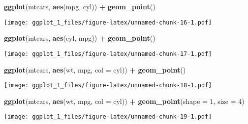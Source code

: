 \documentclass[]{article}
\newenvironment{Shaded}{\begin{snugshade}}{\end{snugshade}}
\newcommand{\DataTypeTok}[1]{\textcolor[rgb]{0.13,0.29,0.53}{#1}}
\newcommand{\DecValTok}[1]{\textcolor[rgb]{0.00,0.00,0.81}{#1}}
\newcommand{\KeywordTok}[1]{\textcolor[rgb]{0.13,0.29,0.53}{\textbf{#1}}}
\newcommand{\NormalTok}[1]{#1}
\newcommand{\OperatorTok}[1]{\textcolor[rgb]{0.81,0.36,0.00}{\textbf{#1}}}
\newcommand{\StringTok}[1]{\textcolor[rgb]{0.31,0.60,0.02}{#1}}
\begin{document}
\begin{Shaded}
\begin{Highlighting}[]
\KeywordTok{ggplot}\NormalTok{(mtcars, }\KeywordTok{aes}\NormalTok{(mpg, cyl)) }\OperatorTok{+}\StringTok{ }\KeywordTok{geom_point}\NormalTok{()}
\end{Highlighting}
\end{Shaded}

\texttt{[image: ggplot\_1\_files/figure-latex/unnamed-chunk-16-1.pdf]}

\begin{Shaded}
\begin{Highlighting}[]
\KeywordTok{ggplot}\NormalTok{(mtcars, }\KeywordTok{aes}\NormalTok{(cyl, mpg)) }\OperatorTok{+}\StringTok{ }\KeywordTok{geom_point}\NormalTok{()}
\end{Highlighting}
\end{Shaded}

\texttt{[image: ggplot\_1\_files/figure-latex/unnamed-chunk-17-1.pdf]}

\begin{Shaded}
\begin{Highlighting}[]
\KeywordTok{ggplot}\NormalTok{(mtcars, }\KeywordTok{aes}\NormalTok{(wt, mpg, }\DataTypeTok{col =}\NormalTok{ cyl)) }\OperatorTok{+}\StringTok{ }\KeywordTok{geom_point}\NormalTok{()}
\end{Highlighting}
\end{Shaded}

\texttt{[image: ggplot\_1\_files/figure-latex/unnamed-chunk-18-1.pdf]}

\begin{Shaded}
\begin{Highlighting}[]
\KeywordTok{ggplot}\NormalTok{(mtcars, }\KeywordTok{aes}\NormalTok{(wt, mpg, }\DataTypeTok{col =}\NormalTok{ cyl)) }\OperatorTok{+}\StringTok{ }\KeywordTok{geom_point}\NormalTok{(}\DataTypeTok{shape =} \DecValTok{1}\NormalTok{, }\DataTypeTok{size =} \DecValTok{4}\NormalTok{)}
\end{Highlighting}
\end{Shaded}

\texttt{[image: ggplot\_1\_files/figure-latex/unnamed-chunk-19-1.pdf]}
\end{document}
